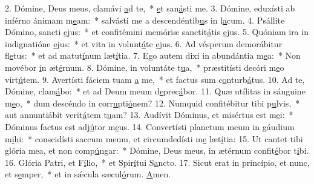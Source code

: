 2. Dómine, Deus meus, clamávi \uline{a}d te,~* \uline{e}t san\uline{á}sti me.
3. Dómine, eduxísti ab inférno ánimam m\uline{e}am:~* salvásti me a descendéntib\uline{u}s in l\uline{a}cum.
4. Psállite Dómino, sancti \uline{e}jus:~* et confitémini memóriæ sanctit\uline{á}tis \uline{e}jus.
5. Quóniam ira in indignatióne \uline{e}jus:~* et vita in volunt\uline{á}te \uline{e}jus.
6. Ad vésperum demorábitur fl\uline{e}tus:~* et ad matut\uline{í}num læt\uline{í}tia.
7. Ego autem dixi in abundántia m\uline{e}a:~* Non movébor \uline{i}n æt\uline{é}rnum.
8. Dómine, in voluntáte t\uline{u}a,~* præstitísti decóri m\uline{e}o virt\uline{ú}tem.
9. Avertísti fáciem tuam \uline{a} me,~* et factus sum c\uline{o}nturb\uline{á}tus.
10. Ad te, Dómine, clam\uline{á}bo:~* et ad Deum meum d\uline{e}prec\uline{á}bor.
11. Quæ utílitas in sánguine m\uline{e}o,~* dum descéndo in corr\uline{u}pti\uline{ó}nem?
12. Numquid confitébitur tibi p\uline{u}lvis,~* aut annuntiábit verit\uline{á}tem t\uline{u}am?
13. Audívit Dóminus, et misértus est m\uline{e}i:~* Dóminus factus est adj\uline{ú}tor m\uline{e}us.
14. Convertísti planctum meum in gáudium m\uline{i}hi:~* conscidísti saccum meum, et circumdedísti m\uline{e} læt\uline{í}tia:
15. Ut cantet tibi glória mea, et non comp\uline{ú}ngar:~* Dómine, Deus meus, in ætérnum confit\uline{é}bor t\uline{i}bi.
16. Glória Patri, et F\uline{í}lio,~* et Spir\uline{í}tui S\uline{a}ncto.
17. Sicut erat in princípio, et nunc, et s\uline{e}mper,~* et in sǽcula sæcul\uline{ó}rum. \uline{A}men.
